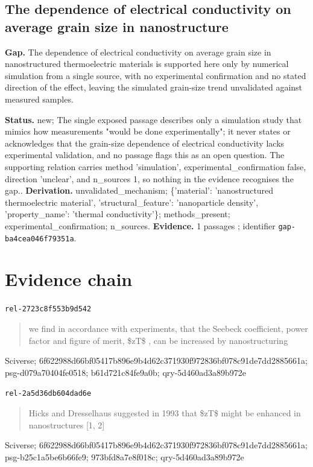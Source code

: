 \documentclass[11pt,a4paper]{article}
\begin{document}
\subsection*{The dependence of electrical conductivity on average grain size in nanostructure}
\textbf{Gap.} The dependence of electrical conductivity on average grain size in nanostructured thermoelectric materials is supported here only by numerical simulation from a single source, with no experimental confirmation and no stated direction of the effect, leaving the simulated grain-size trend unvalidated against measured samples.

\textbf{Status.} new; The single exposed passage describes only a simulation study that mimics how measurements "would be done experimentally"; it never states or acknowledges that the grain-size dependence of electrical conductivity lacks experimental validation, and no passage flags this as an open question. The supporting relation carries method 'simulation', experimental\_confirmation false, direction 'unclear', and n\_sources 1, so nothing in the evidence recognises the gap..
\textbf{Derivation.} unvalidated\_mechanism; \{'material': 'nanostructured thermoelectric material', 'structural\_feature': 'nanoparticle density', 'property\_name': 'thermal conductivity'\}; methods\_present; experimental\_confirmation; n\_sources.
\textbf{Evidence.} 1 passages \cite{LimitationsOfZtAsAFigure201962331153}; identifier \texttt{gap-ba4cea046f79351a}.

\section{Evidence chain}
\label{sec:chain}
\noindent\texttt{rel-2723c8f553b9d542} \cite{LimitationsOfZtAsAFigure201962331153}
\begin{quote}we find in accordance with experiments, that the Seebeck coefficient, power factor and figure of merit, \$zT\$ , can be increased by nanostructuring\end{quote}
{\small Sciverse; 6f622988d66bf05417b896e9b4d62c371930f972836bf078c91de7dd2885661a; psg-d079a70404fe0518; b61d721c84fe9a0b; qry-5d460ad3a89b972e}

\noindent\texttt{rel-2a5d36db604dad6e} \cite{LimitationsOfZtAsAFigure201962331153}
\begin{quote}Hicks and Dresselhaus suggested in 1993 that \$zT\$ might be enhanced in nanostructures [1, 2]\end{quote}
{\small Sciverse; 6f622988d66bf05417b896e9b4d62c371930f972836bf078c91de7dd2885661a; psg-b25c1a5be6b66fe9; 973bfd8a7e8f018c; qry-5d460ad3a89b972e}
\end{document}
